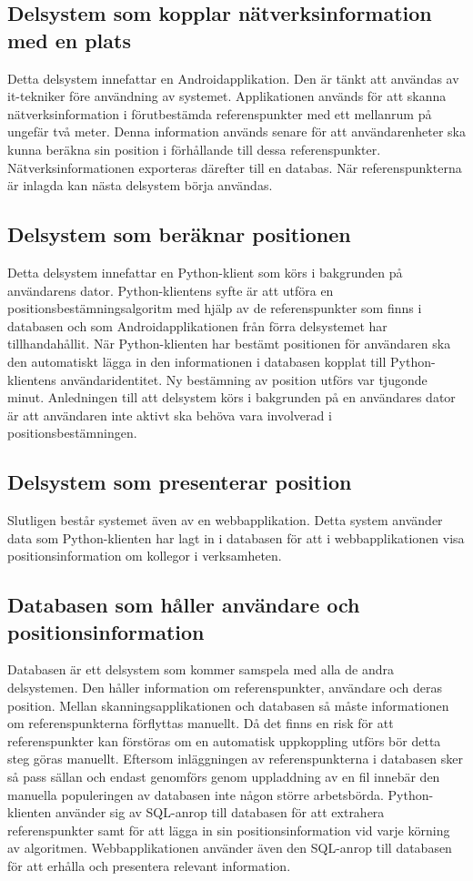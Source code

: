 \documentclass[a4paper,12pt]{article}
\begin{document}
 \subsection{Delsystem som kopplar nätverksinformation med en plats}
 Detta delsystem innefattar en Androidapplikation. Den är tänkt att användas av it-tekniker före användning av systemet. Applikationen används för att skanna nätverksinformation i förutbestämda referenspunkter med ett mellanrum på ungefär två meter. Denna information används senare för att användarenheter ska kunna beräkna sin position i förhållande till dessa referenspunkter. Nätverksinformationen exporteras därefter till en databas. När referenspunkterna är inlagda kan nästa delsystem börja användas.

 \subsection{Delsystem som beräknar positionen}
 Detta delsystem innefattar en Python-klient som körs i bakgrunden på användarens dator. Python-klientens syfte är att utföra en positionsbestämningsalgoritm med hjälp av de referenspunkter som finns i databasen och som Androidapplikationen från förra delsystemet har tillhandahållit. När Python-klienten har bestämt positionen för användaren ska den automatiskt lägga in den informationen i databasen kopplat till Python-klientens användaridentitet. Ny bestämning av position utförs var tjugonde minut. Anledningen till att delsystem körs i bakgrunden på en användares dator är att användaren inte aktivt ska behöva vara involverad i positionsbestämningen.

 \subsection{Delsystem som presenterar position}
 Slutligen består systemet även av en webbapplikation. Detta system använder data som Python-klienten har lagt in i databasen för att i webbapplikationen visa positionsinformation om kollegor i verksamheten.

 \subsection{Databasen som håller användare och positionsinformation}
 Databasen är ett delsystem som kommer samspela med alla de andra delsystemen. Den håller information om referenspunkter, användare och deras position.
 Mellan skanningsapplikationen och databasen så måste informationen om referenspunkterna förflyttas manuellt. Då det finns en risk för att referenspunkter kan förstöras om en automatisk uppkoppling utförs bör detta steg göras manuellt. Eftersom inläggningen av referenspunkterna i databasen sker så pass sällan och endast genomförs genom uppladdning av en fil innebär den manuella populeringen av databasen inte någon större arbetsbörda. Python-klienten använder sig av SQL-anrop till databasen för att extrahera referenspunkter samt för att lägga in sin positionsinformation vid varje körning av algoritmen. Webbapplikationen använder även den SQL-anrop till databasen för att erhålla och presentera relevant information.
\end{document}
